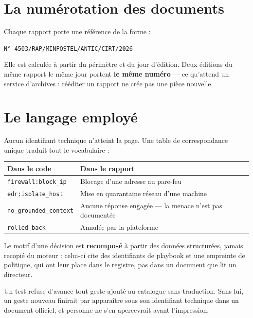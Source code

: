 \section{La numérotation des documents}

Chaque rapport porte une référence de la forme :

\begin{center}
\texttt{N° 4503/RAP/MINPOSTEL/ANTIC/CIRT/2026}
\end{center}

Elle est calculée à partir du périmètre et du jour d'édition. Deux éditions du
même rapport le même jour portent \textbf{le même numéro} — ce qu'attend un
service d'archives : rééditer un rapport ne crée pas une pièce nouvelle.

\section{Le langage employé}

Aucun identifiant technique n'atteint la page. Une table de correspondance
unique traduit tout le vocabulaire :

\begin{center}
\begin{tabular}{@{}ll@{}}
\toprule
\textbf{Dans le code} & \textbf{Dans le rapport} \\
\midrule
\texttt{firewall:block\_ip} & Blocage d'une adresse au pare-feu \\
\texttt{edr:isolate\_host} & Mise en quarantaine réseau d'une machine \\
\texttt{no\_grounded\_context} & Aucune réponse engagée --- la menace n'est
pas documentée \\
\texttt{rolled\_back} & Annulée par la plateforme \\
\bottomrule
\end{tabular}
\end{center}

Le motif d'une décision est \textbf{recomposé} à partir des données
structurées, jamais recopié du moteur : celui-ci cite des identifiants de
playbook et une empreinte de politique, qui ont leur place dans le registre,
pas dans un document que lit un directeur.

\begin{tcolorbox}[colback=green!4!white, colframe=darkgreen,
  title=\textbf{Bon à savoir}, fonttitle=\bfseries, boxrule=0.6pt]
Un test refuse d'avance tout geste ajouté au catalogue sans traduction. Sans
lui, un geste nouveau finirait par apparaître sous son identifiant technique
dans un document officiel, et personne ne s'en apercevrait avant l'impression.
\end{tcolorbox}
